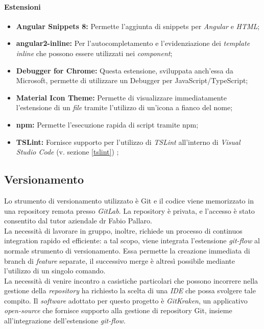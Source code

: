 \paragraph{Estensioni}
\begin{itemize}
	\item \textbf{Angular Snippets 8:} Permette l'aggiunta di \gls{snippets} per \textit{Angular} e \textit{HTML};
	\item \textbf{angular2-inline:} Per l'autocompletamento e l'evidenziazione dei \textit{template inline} che possono essere utilizzati nei \textit{component};
	\item \textbf{Debugger for Chrome:} Questa estensione, sviluppata anch'essa da Microsoft, permette di utilizzare un \gls{Debugger} per JavaScript/TypeScript;
	\item \textbf{Material Icon Theme:} Permette di visualizzare immediatamente l'estensione di un \textit{file} tramite l'utilizzo di un'icona a fianco del nome;
	\item \textbf{npm:} Permette l'esecuzione rapida di script tramite \gls{npm};
	\item \textbf{TSLint:} Fornisce supporto per l'utilizzo di \textit{TSLint} all'interno di \textit{Visual Studio Code} (v. sezione \ref{tslint}) ;
\end{itemize}

\subsection{Versionamento}
Lo strumento di versionamento utilizzato è \gls{Git} e il codice viene memorizzato in una \gls{repository} remota presso \textit{GitLab}. La repository è privata, e l'accesso è stato consentito dal tutor aziendale dr Fabio Pallaro.\\
La necessità di lavorare in gruppo, inoltre, richiede un processo di \gls{continuos integration} rapido ed efficiente: a tal scopo, viene integrata l'estensione \textit{git-flow}  al normale strumento di versionamento. Essa permette la creazione immediata di \gls{branch} di \textit{feature} separate, il successivo \gls{merge} è altresì possibile mediante l'utilizzo di un singolo comando.\\
La necessità di venire incontro a casistiche particolari che possono incorrere nella gestione della \textit{repository} ha richiesto la scelta di una \textit{IDE} che possa svolgere tale compito. Il \textit{software} adottato per questo progetto è \textit{GitKraken}, un applicativo \textit{open-source} che fornisce  supporto alla gestione di repository \gls{Git}, insieme all'integrazione dell'estensione \textit{git-flow}.

